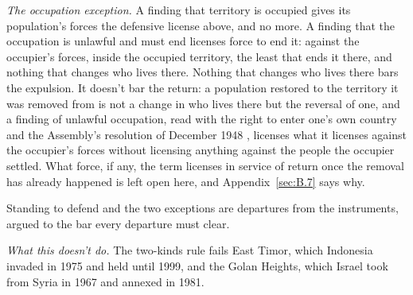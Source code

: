 \emph{The occupation exception.} A finding that territory is occupied gives its population's forces the defensive license above, and no more. A finding that the occupation is unlawful and must end licenses force to end it: against the occupier's forces, inside the occupied territory, the least that ends it there, and nothing that changes who lives there.
Nothing that changes who lives there bars the expulsion. It doesn't bar the return: a population restored to the territory it was removed from is not a change in who lives there but the reversal of one, and a finding of unlawful occupation, read with the right to enter one's own country and the Assembly's resolution of December 1948 \autocite{unga194}, licenses what it licenses against the occupier's forces without licensing anything against the people the occupier settled. What force, if any, the term licenses in service of return once the removal has already happened is left open here, and Appendix~\ref{sec:B.7} says why.

Standing to defend and the two exceptions are departures from the instruments, argued to the bar every departure must clear.

\emph{What this doesn't do.} The two-kinds rule fails East Timor, which Indonesia invaded in 1975 and held until 1999, and the Golan Heights, which Israel took from Syria in 1967 and annexed in 1981.
